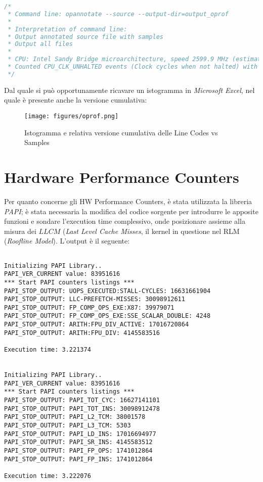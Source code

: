 \begin{lstlisting}[language=C,breaklines=true]
/* 
 * Command line: opannotate --source --output-dir=output_oprof 
 * 
 * Interpretation of command line:
 * Output annotated source file with samples
 * Output all files
 * 
 * CPU: Intel Sandy Bridge microarchitecture, speed 2599.9 MHz (estimated)
 * Counted CPU_CLK_UNHALTED events (Clock cycles when not halted) with a unit mask of 0x00 (No unit mask) count 100000
 */

\end{lstlisting}

Dal quale si può opportunamente ricavare un istogramma in \emph{Microsoft Excel}, nel quale è presente anche la versione cumulativa:

\begin{center}
\begin{figure}[H]
\centering
\texttt{[image: figures/oprof.png]}
\caption{Istogramma e relativa versione cumulativa delle Line Codes vs Samples}
\end{figure}
\end{center}
 
\section{Hardware Performance Counters}

Per quanto concerne gli HW Performance Counters, è stata utilizzata la libreria \textit{PAPI}; è stata necessaria la modifica del codice sorgente per introdurre le apposite funzioni e sondare l'execution time complessivo, onde posizionare assieme alla misura dei $LLCM$ (\textit{Last Level Cache Misses}, il kernel in questione nel RLM (\emph{Roofline Model}). L'output è il seguente:

\begin{lstlisting}

Initializing PAPI Library..
PAPI_VER_CURRENT value: 83951616
*** Start PAPI counters listings ***
PAPI_STOP_OUTPUT: UOPS_EXECUTED:STALL-CYCLES: 16631661904
PAPI_STOP_OUTPUT: LLC-PREFETCH-MISSES: 30098912611
PAPI_STOP_OUTPUT: FP_COMP_OPS_EXE:X87: 39979071
PAPI_STOP_OUTPUT: FP_COMP_OPS_EXE:SSE_SCALAR_DOUBLE: 4248
PAPI_STOP_OUTPUT: ARITH:FPU_DIV_ACTIVE: 17016720864
PAPI_STOP_OUTPUT: ARITH:FPU_DIV: 4145583516

Execution time: 3.221374


Initializing PAPI Library..
PAPI_VER_CURRENT value: 83951616
*** Start PAPI counters listings ***
PAPI_STOP_OUTPUT: PAPI_TOT_CYC: 16627141101
PAPI_STOP_OUTPUT: PAPI_TOT_INS: 30098912478
PAPI_STOP_OUTPUT: PAPI_L2_TCM: 38001578
PAPI_STOP_OUTPUT: PAPI_L3_TCM: 5303
PAPI_STOP_OUTPUT: PAPI_LD_INS: 17016694977
PAPI_STOP_OUTPUT: PAPI_SR_INS: 4145583512
PAPI_STOP_OUTPUT: PAPI_FP_OPS: 1741012864
PAPI_STOP_OUTPUT: PAPI_FP_INS: 1741012864

Execution time: 3.222076


\end{lstlisting}

